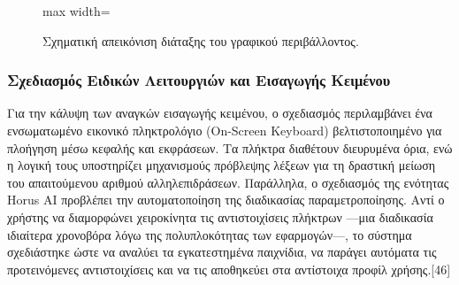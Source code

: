 \documentclass[twoside, a4paper, 11pt]{article}
\begin{document}
\begin{figure}[H]
\begin{adjustbox}{max width=\textwidth}
    \end{adjustbox}
    \caption{Σχηματική απεικόνιση διάταξης του γραφικού περιβάλλοντος.}
    \label{fig:wireframe_ui}
\end{figure}

\subsubsection{Σχεδιασμός Ειδικών Λειτουργιών και Εισαγωγής Κειμένου}
Για την κάλυψη των αναγκών εισαγωγής κειμένου, ο σχεδιασμός περιλαμβάνει ένα ενσωματωμένο εικονικό πληκτρολόγιο (On-Screen Keyboard) 
βελτιστοποιημένο για πλοήγηση μέσω κεφαλής και εκφράσεων. Τα πλήκτρα διαθέτουν διευρυμένα όρια, ενώ η λογική τους υποστηρίζει μηχανισμούς πρόβλεψης λέξεων για τη δραστική μείωση 
του απαιτούμενου αριθμού αλληλεπιδράσεων. 
Παράλληλα, ο σχεδιασμός της ενότητας Horus AI προβλέπει την αυτοματοποίηση της διαδικασίας παραμετροποίησης. 
Αντί ο χρήστης να διαμορφώνει χειροκίνητα τις αντιστοιχίσεις πλήκτρων —μια διαδικασία ιδιαίτερα χρονοβόρα λόγω της πολυπλοκότητας των εφαρμογών—, 
το σύστημα σχεδιάστηκε ώστε να αναλύει τα εγκατεστημένα παιχνίδια, να παράγει αυτόματα τις προτεινόμενες αντιστοιχίσεις και να τις αποθηκεύει στα αντίστοιχα προφίλ χρήσης.[46]
\end{document}
